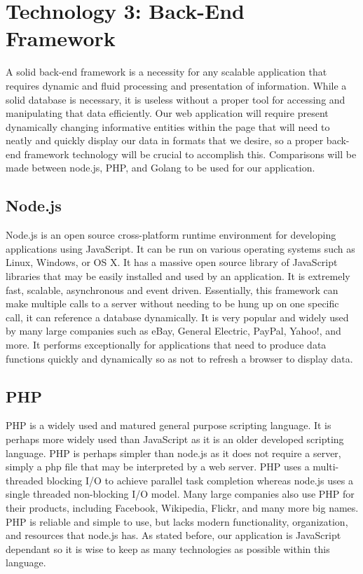 \documentclass[onecolumn, draftclsnofoot,10pt, compsoc]{IEEEtran}
\begin{document}
	
\section{Technology 3: Back-End Framework}

	A solid back-end framework is a necessity for any scalable application that requires dynamic and fluid processing and presentation of information. While a solid
	database is necessary, it is useless without a proper tool for accessing and manipulating that data efficiently. Our  web application will require present dynamically 
	changing informative entities within the page that will need to neatly and quickly display our data in formats that we desire, so a proper back-end framework technology
	will be crucial to accomplish this. Comparisons will be made between node.js, PHP, and Golang to be used for our application.

	\subsection{Node.js}
	
		Node.js is an open source cross-platform runtime environment for developing applications using JavaScript. It can be run on various operating systems such as Linux, Windows, or OS X.
		It has a massive open source library of JavaScript libraries that may be easily installed and used by an application. It is extremely fast, scalable, asynchronous and
		event driven. Essentially, this framework can make multiple calls to a server without needing to be hung up on one specific call, it can reference a database dynamically. 
		It is very popular and widely used by many large companies such as eBay, General Electric, PayPal, Yahoo!, and more. It performs exceptionally for applications that need to produce data
		functions quickly and dynamically so as not to refresh a browser to display data. 
	
	\subsection{PHP}
	
		PHP is a widely used and matured general purpose scripting language. It is perhaps more widely used than JavaScript as it is an older developed scripting language. PHP is perhaps
		simpler than node.js as it does not require a server, simply a php file that may be interpreted by a web server. PHP uses a multi-threaded blocking I/O to achieve parallel task 
		completion whereas node.js uses a single threaded non-blocking I/O model. Many large companies also use PHP for their products, including Facebook, Wikipedia, Flickr, and many
		more big names. PHP is reliable and simple to use, but lacks modern functionality, organization, and resources that node.js has. As stated before, our application is JavaScript
		dependant so it is wise to keep as many technologies as possible within this language.
	
\end{document}
